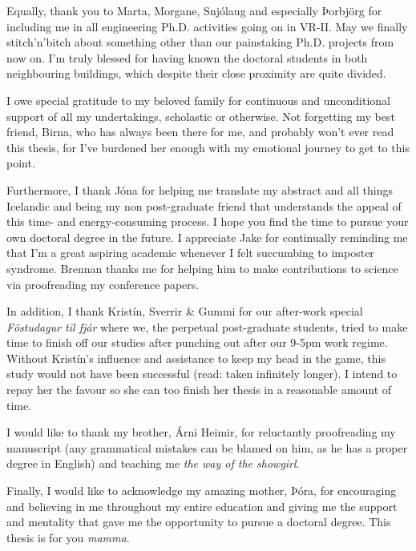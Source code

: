 Equally, thank you to Marta, Morgane, Snjólaug and especially Þorbjörg for 
including me in all engineering Ph.D. activities going on in VR-II. 
May we finally stitch'n'bitch about something other than our painstaking Ph.D. 
projects from now on.  
I'm truly blessed for having known the doctoral students in both neighbouring 
buildings, which despite their close proximity are quite divided.

I owe special gratitude to my beloved family for continuous and unconditional 
support of all my undertakings, scholastic or otherwise. 
Not forgetting my best friend, Birna, who has always been there for me, and 
probably won't ever read this thesis, for I've burdened her enough with my 
emotional journey to get to this point. 

Furthermore, I thank Jóna for helping me translate my abstract and all things 
Icelandic and being my non post-graduate friend that understands the appeal of 
this time- and energy-consuming process. I hope you find the time to pursue 
your own doctoral degree in the future.
I appreciate Jake for continually reminding me that I'm a great aspiring 
academic whenever I felt succumbing to imposter syndrome.
Brennan thanks me for helping him to make contributions to science via 
proofreading my conference papers.

In addition, I thank Kristín, Sverrir \& Gummi for our after-work special 
\emph{Föstudagur til fjár} where we, the perpetual post-graduate students, 
tried to make time to finish off our studies after punching out after our 9-5pm 
work regime. 
Without Kristín's influence and assistance to keep my head in the game, this 
study would not have been successful (read: taken infinitely longer). I intend 
to repay her the favour so she can too finish her thesis in a reasonable amount 
of time.

I would like to thank my brother, Árni Heimir, for reluctantly proofreading my 
manuscript (any grammatical mistakes can be blamed on him, as he has a proper 
degree in English) and teaching me \emph{the way of the showgirl}.

Finally, I would like to acknowledge my amazing mother, Þóra, for encouraging 
and believing in me throughout my entire education and giving me the support 
and mentality that gave me the opportunity to pursue a doctoral degree. This 
thesis is for you \emph{mamma}.

